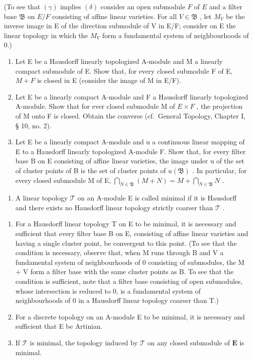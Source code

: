 (To see that \((\gamma)\) implies \((\delta)\) consider an open submodule \(F\) of \(E\) and a filter base \(\mathfrak{B}\) on \(E / F\) consisting of affine linear varieties. For all \(V \in \mathfrak{B}\) , let \(M_V\) be the inverse image in E of the direction submodule of V in E/F; consider on E the linear topology in which the \(M_{V}\) form a fundamental system of neighbourhoods of 0.)

\begin{enumerate}
\def\labelenumi{(\alph{enumi})}
\setcounter{enumi}{1}
\item
  Let E be a Hausdorff linearly topologized A-module and M a linearly compact submodule of E. Show that, for every closed submodule F of E, \(M + F\) is closed in E (consider the image of M in E/F).
\item
  Let E be a linearly compact A-module and F a Hausdorff linearly topologized A-module. Show that for ever closed submodule M of \(E \times F\) , the projection of M onto F is closed. Obtain the converse (cf.~General Topology, Chapter I, § 10, no. 2).
\item
  Let E be a linearly compact A-module and u a continuous linear mapping of E to a Hausdorff linearly topologized A-module F. Show that, for every filter base B on E consisting of affine linear varieties, the image under u of the set of cluster points of B is the set of cluster points of \(u(\mathfrak{B})\) . In particular, for every closed submodule M of E, \(\bigcap_{N\in\mathfrak{B}}(M+N)=M+\bigcap_{N\in\mathfrak{B}}N\) .
\end{enumerate}

\begin{enumerate}
\def\labelenumi{\arabic{enumi}.}
\setcounter{enumi}{16}
\tightlist
\item
  A linear topology \(\mathcal{T}\) on an A-module E is called minimal if it is Hausdorff and there exists no Hausdorff linear topology strictly coarser than \(\mathcal{T}\) .
\end{enumerate}

\begin{enumerate}
\def\labelenumi{(\alph{enumi})}
\item
  For a Hausdorff linear topology T on E to be minimal, it is necessary and sufficient that every filter base B on E, consisting of affine linear varieties and having a single cluster point, be convergent to this point. (To see that the condition is necessary, observe that, when M runs through B and V a fundamental system of neighbourhoods of 0 consisting of submodules, the M + V form a filter base with the same cluster points as B. To see that the condition is sufficient, note that a filter base consisting of open submodules, whose intersection is reduced to 0, is a fundamental system of neighbourhoods of 0 in a Hausdorff linear topology coarser than T.)
\item
  For a discrete topology on an A-module E to be minimal, it is necessary and sufficient that E be Artinian.
\item
  If \(\mathcal{T}\) is minimal, the topology induced by \(\mathcal{T}\) on any closed submodule of \(\mathbf{E}\) is minimal.
\end{enumerate}

